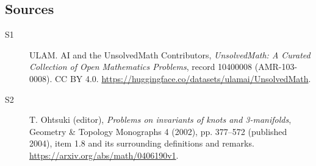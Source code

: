 \documentclass[11pt]{article}
\begin{document}
\subsection{Sources}
\begin{description}
\item[\hypertarget{source:10400008:1}{S1}] ULAM. AI and the UnsolvedMath Contributors, \emph{UnsolvedMath: A Curated Collection of Open Mathematics Problems}, record 10400008 (AMR-103-0008). CC BY 4.0. \url{https://huggingface.co/datasets/ulamai/UnsolvedMath}.
\item[\hypertarget{source:10400008:2}{S2}] T. Ohtsuki (editor), \emph{Problems on invariants of knots and 3-manifolds}, Geometry \& Topology Monographs 4 (2002), pp. 377--572 (published 2004), item 1.8 and its surrounding definitions and remarks. \url{https://arxiv.org/abs/math/0406190v1}.
\end{description}
\label{end:10400008}
\end{document}
